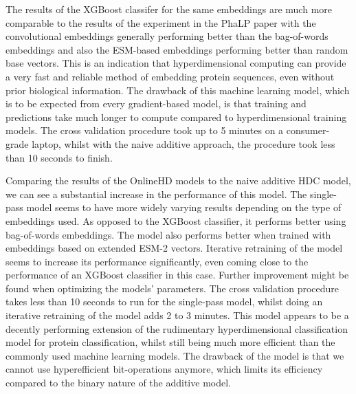 The results of the XGBoost classifer for the same embeddings are much more comparable to the results of the experiment in the PhaLP paper with the convolutional embeddings generally performing better than the bag-of-words embeddings and also the ESM-based embeddings performing better than random base vectors. This is an indication that hyperdimensional computing can provide a very fast and reliable method of embedding protein sequences, even without prior biological information. The drawback of this machine learning model, which is to be expected from every gradient-based model, is that training and predictions take much longer to compute compared to hyperdimensional training models. The cross validation procedure took up to 5 minutes on a consumer-grade laptop, whilst with the naive additive approach, the procedure took less than 10 seconds to finish.

Comparing the results of the OnlineHD models to the naive additive HDC model, we can see a substantial increase in the performance of this model. The single-pass model seems to have more widely varying results depending on the type of embeddings used. As opposed to the XGBoost classifier, it performs better using bag-of-words embeddings. The model also performs better when trained with embeddings based on extended ESM-2 vectors. Iterative retraining of the model seems to increase its performance significantly, even coming close to the performance of an XGBoost classifier in this case. Further improvement might be found when optimizing the models' parameters. The cross validation procedure takes less than 10 seconds to run for the single-pass model, whilst doing an iterative retraining of the model adds 2 to 3 minutes. This model appears to be a decently performing extension of the rudimentary hyperdimensional classification model for protein classification, whilst still being much more efficient than the commonly used machine learning models. The drawback of the model is that we cannot use hyperefficient bit-operations anymore, which limits its efficiency compared to the binary nature of the additive model.

